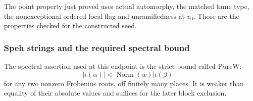 The point property just proved uses actual automorphy,
the matched tame type, the nonexceptional ordered local
flag and unramifiedness at \(v_0\).
Those are the properties checked for the constructed seed.

\subsubsection{Speh strings and the required spectral bound}
The spectral assertion used at this endpoint is the
strict bound called \(\mathrm{PureW}\):
\[
               |\iota(\alpha)|<
                    \operatorname{Norm}(w)|\iota(\beta)|
 \tag{H13}
\]
for any two nonzero Frobenius roots, off finitely many
places. It is weaker than equality of their absolute
values and suffices for the later block exclusion.

